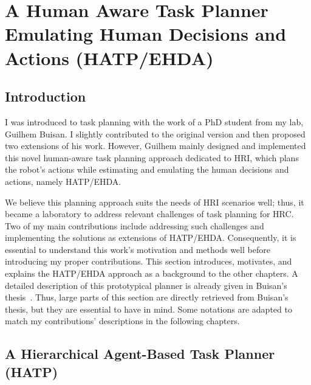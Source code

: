\ifdefined{}
\else
\setcounter{chapter}{1} %
\dominitoc
\faketableofcontents
\fi

\chapter{A Human Aware Task Planner Emulating Human Decisions and Actions (HATP/EHDA)}
\label{chap:2}
\minitoc


\section{Introduction}

I was introduced to task planning with the work of a PhD student from my lab, Guilhem Buisan. I slightly contributed to the original version and then proposed two extensions of his work. However, Guilhem mainly designed and implemented this novel human-aware task planning approach dedicated to HRI, which plans the robot's actions while estimating and emulating the human decisions and actions, namely HATP/EHDA. 

We believe this planning approach suits the needs of HRI scenarios well; thus, it became a laboratory to address relevant challenges of task planning for HRC. 
Two of my main contributions include addressing such challenges and implementing the solutions as extensions of HATP/EHDA.   
Consequently, it is essential to understand this work's motivation and methods well before introducing my proper contributions. This section introduces, motivates, and explains the HATP/EHDA approach as a background to the other chapters. 
A detailed description of this prototypical planner is already given in Buisan's thesis~\cite{thesisBuisan21}. Thus, large parts of this section are directly retrieved from Buisan's thesis, but they are essential to have in mind. Some notations are adapted to match my contributions' descriptions in the following chapters. 

\section{A Hierarchical Agent-Based Task Planner (HATP)}

